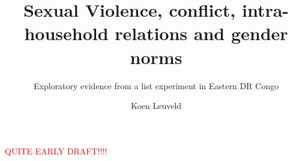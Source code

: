 \documentclass[10pt,a4paper]{scrartcl} %
\begin{document}
\author{Koen Leuveld}




\title{Sexual Violence, conflict, intra-household relations and gender norms}
\subtitle{Exploratory evidence from a list experiment in Eastern DR Congo} %

\maketitle

\begin{center}
\textcolor{red}{\Large QUITE EARLY DRAFT!!!!}
\end{center}







\end{document}

